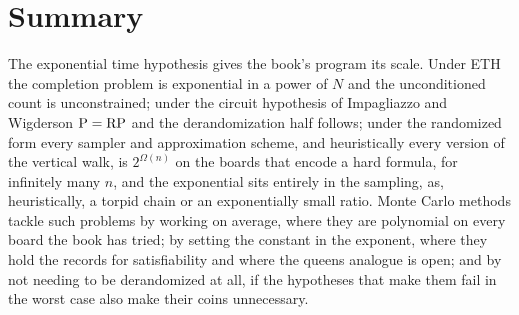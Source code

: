 \section{Summary}

The exponential time hypothesis gives the book's program its scale. Under ETH the completion problem is exponential in a power of $N$ and the unconditioned count is unconstrained; under the circuit hypothesis of Impagliazzo and Wigderson $\mathrm{P} = \mathrm{RP}$ and the derandomization half follows; under the randomized form every sampler and approximation scheme, and heuristically every version of the vertical walk, is $2^{\Omega(n)}$ on the boards that encode a hard formula, for infinitely many $n$, and the exponential sits entirely in the sampling, as, heuristically, a torpid chain or an exponentially small ratio. Monte Carlo methods tackle such problems by working on average, where they are polynomial on every board the book has tried; by setting the constant in the exponent, where they hold the records for satisfiability and where the queens analogue is open; and by not needing to be derandomized at all, if the hypotheses that make them fail in the worst case also make their coins unnecessary.
